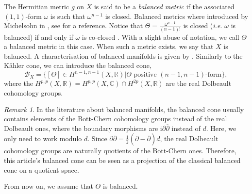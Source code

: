 \documentclass{article}
\theoremstyle{remark}
\newtheorem*{remark}{Remark}
\theoremstyle{definition}
\newcommand{\R}{\mathbb{R}}
\newcommand{\C}{\mathbb{C}}
\renewcommand{\i}{\boldsymbol{\mathrm{i}}}
\newcommand{\dbar}{\overline{\partial}}
\begin{document}
The Hermitian metric $g$ on $X$ is said to be a \textit{balanced metric} if the associated $(1,1)$-form $\omega$ is such that $\omega^{n - 1}$ is closed. Balanced metrics where introduced by Michelsohn in \cite{Michelsohn}, see \cite{Fu} for a reference. Notice that $\Theta = \frac{\omega^{n - 1}}{(n - 1)!}$ is closed (\textit{i.e.} $\omega$ is balanced) if and only if $\omega$ is co-closed \cite[Proposition 1]{Gauduchon}. With a slight abuse of notation, we call $\Theta$ a balanced metric in this case. When such a metric exists, we say that $X$ is balanced. A characterisation of balanced manifolds is given by \cite[Theorem A]{Michelsohn}. Similarly to the Kähler cone, we can introduce the balanced cone,
$$
\mathcal{B}_X = \{[\Theta] \in H^{n - 1,n - 1}(X,\R)|\Theta \textrm{ positive $(n - 1,n - 1)$-form}\},
$$
where the $H^{p,p}(X,\R) = H^{p,p}(X,\C) \cap H^{2p}(X,\R)$ are the real Dolbeault cohomology groups.
\begin{remark}
In the literature about balanced manifolds, the balanced cone usually contains elements of the Bott-Chern cohomology groups instead of the real Dolbeault ones, where the boundary morphisms are $\i\partial\dbar$ instead of $d$. Here, we only need to work modulo $d$. Since $\partial\dbar = \frac{1}{2}(\partial - \dbar)d$, the real Dolbeault cohomology groups are naturally quotients of the Bott-Chern ones. Therefore, this article's balanced cone can be seen as a projection of the classical balanced cone on a quotient space.
\end{remark}
From now on, we assume that $\Theta$ is balanced.
\end{document}
